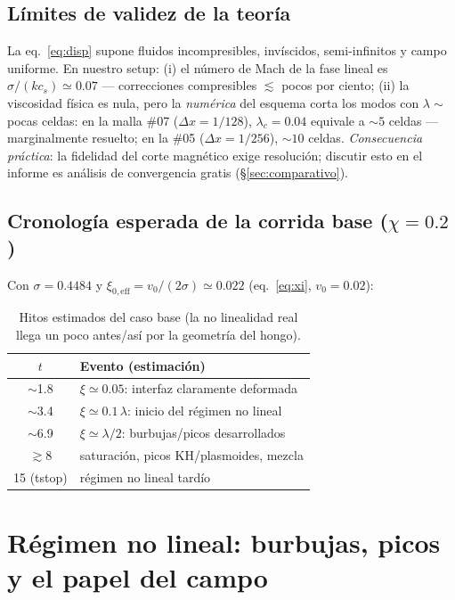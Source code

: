 \documentclass[11pt,a4paper]{article}
\begin{document}
\subsection{Límites de validez de la teoría}

La eq.~\eqref{eq:disp} supone fluidos incompresibles, invíscidos, semi-infinitos y campo
uniforme. En nuestro setup: (i) el número de Mach de la fase lineal es
$\sigma/(k c_s)\simeq0.07$ — correcciones compresibles $\lesssim$ pocos por ciento;
(ii) la viscosidad física es nula, pero la \emph{numérica} del esquema corta los modos
con $\lambda\sim$ pocas celdas: en la malla \#07 ($\Delta x=1/128$), $\lambda_c=0.04$
equivale a $\sim5$ celdas --- marginalmente resuelto; en la \#05 ($\Delta x=1/256$), $\sim10$
celdas. \emph{Consecuencia práctica}: la fidelidad del corte magnético exige resolución;
discutir esto en el informe es análisis de convergencia gratis (§\ref{sec:comparativo}).

\subsection{Cronología esperada de la corrida base ($\chi=0.2$)}

Con $\sigma=0.4484$ y $\xi_{0,\mathrm{eff}}=v_0/(2\sigma)\simeq0.022$ (eq.~\ref{eq:xi},
$v_0=0.02$):
\begin{table}[htbp]
\centering\small
\caption{Hitos estimados del caso base (la no linealidad real llega un poco antes/así
por la geometría del hongo).}
\begin{tabular}{@{}cl@{}}
\toprule
$t$ & Evento (estimación) \\
\midrule
$\sim$1.8 & $\xi\simeq0.05$: interfaz claramente deformada \\
$\sim$3.4 & $\xi\simeq0.1\,\lambda$: inicio del régimen no lineal \\
$\sim$6.9 & $\xi\simeq\lambda/2$: burbujas/picos desarrollados \\
$\gtrsim$8 & saturación, picos KH/plasmoides, mezcla \\
15 (tstop) & régimen no lineal tardío \\
\bottomrule
\end{tabular}
\end{table}

\section{Régimen no lineal: burbujas, picos y el papel del campo}
\label{sec:nolineal}
\end{document}
